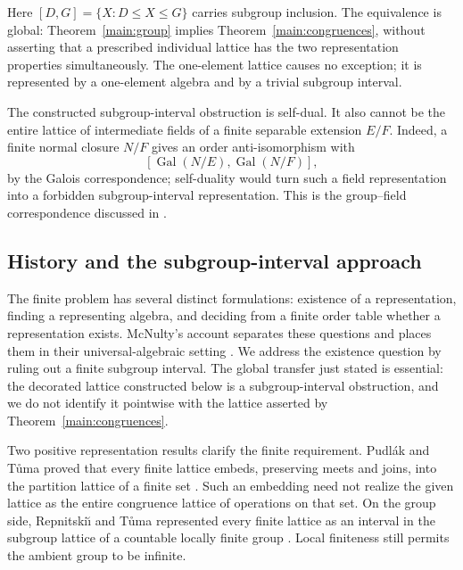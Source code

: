 Here $[D,G]=\{X:D\le X\le G\}$ carries subgroup inclusion. The equivalence
is global: Theorem~\ref{main:group} implies
Theorem~\ref{main:congruences}, without asserting that a prescribed
individual lattice has the two representation properties simultaneously.
The one-element lattice causes no exception; it is represented by a
one-element algebra and by a trivial subgroup interval.

The constructed subgroup-interval obstruction is self-dual.  It also
cannot be the entire lattice of intermediate fields of a finite separable
extension $E/F$.  Indeed, a
finite normal closure $N/F$ gives an order anti-isomorphism with
\[
 [\operatorname{Gal}(N/E),\operatorname{Gal}(N/F)],
\]
by the Galois correspondence; self-duality would turn such a field
representation into a forbidden subgroup-interval representation.
This is the group--field correspondence discussed in
\cite[Section~3]{PalfyTwisted}.

\subsection{History and the subgroup-interval approach}

The finite problem has several distinct formulations: existence of a
representation, finding a representing algebra, and deciding from a finite
order table whether a representation exists.  McNulty's account separates
these questions and places them in their universal-algebraic setting
\cite[pp.~29--30]{McNulty2015}.  We address the existence question by
ruling out a finite subgroup interval.  The global transfer just stated
is essential: the decorated lattice constructed below is a subgroup-interval
obstruction, and we do not identify it pointwise with the lattice asserted
by Theorem~\ref{main:congruences}.

Two positive representation results clarify the finite requirement.
Pudl\'ak and T\r{u}ma proved that every finite lattice embeds, preserving
meets and joins, into the partition lattice of a finite set
\cite{PudlakTuma1980}.  Such an embedding need not realize the given
lattice as the entire congruence lattice of operations on that set.
On the group side, Repnitski{\u{\i}} and T\r{u}ma represented every finite
lattice as an interval in the subgroup lattice of a countable locally
finite group \cite{RepnitskiiTuma2008}.  Local finiteness still permits
the ambient group to be infinite.

